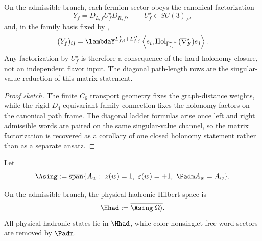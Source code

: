 \begin{corollary}
On the admissible branch, each fermion sector obeys the canonical factorization
\[
Y_f=D_{L,f}U_f^\star D_{R,f},
\qquad
U_f^\star\in SU(3)_F,
\]
and, in the family basis fixed by ,
\[
(Y_f)_{ij}
=
\lambdaY^{L^L_{f,i}+L^R_{f,j}}
\left\langle e_i,\mathrm{Hol}_{\Gamma_{ij}^{\min}}(\nabla_F^\star)e_j\right\rangle.
\]
Any factorization by $U_f^\star$ is therefore a consequence of the hard holonomy closure, not an
independent flavor input. The diagonal path-length rows  are the
singular-value reduction of this matrix statement.
\end{corollary}

\begin{proof}[Proof sketch]
The finite $C_6$ transport geometry fixes the graph-distance weights, while the rigid
$D_4$-equivariant family connection fixes the holonomy factors on the canonical path frame. The
diagonal ladder formulas arise once left and right admissible words are paired on the same
singular-value channel, so the matrix factorization is recovered as a corollary of one closed
holonomy statement rather than as a separate ansatz.
\end{proof}

\begin{definition}
Let
\[
\Asing
:=
\overline{\mathrm{span}}\{A_w:\ z(w)=1,\ \varepsilon(w)=+1,\ \Padm A_w=A_w\}.
\]
\end{definition}

\begin{theorem}
On the admissible branch, the physical hadronic Hilbert space is
\[
\Hhad:=\overline{\Asing|\Omega\rangle}.
\]
All physical hadronic states lie in $\Hhad$, while color-nonsinglet free-word sectors are removed by $\Padm$.
\end{theorem}
